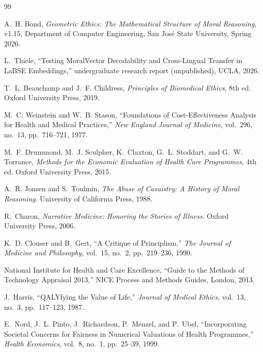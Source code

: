 \documentclass[12pt]{article}
\theoremstyle{definition}
\theoremstyle{remark}
\begin{document}
\begin{thebibliography}{99}

A.~H. Bond, \emph{Geometric Ethics: The Mathematical Structure of Moral Reasoning}, v1.15, Department of Computer Engineering, San Jos\'{e} State University, Spring 2026.

L.~Thiele, ``Testing MoralVector Decodability and Cross-Lingual Transfer in LaBSE Embeddings,'' undergraduate research report (unpublished), UCLA, 2026.

T.~L. Beauchamp and J.~F. Childress, \emph{Principles of Biomedical Ethics}, 8th ed.  Oxford University Press, 2019.

M.~C. Weinstein and W.~B. Stason, ``Foundations of Cost-Effectiveness Analysis for Health and Medical Practices,'' \emph{New England Journal of Medicine}, vol.~296, no.~13, pp.~716--721, 1977.

M.~F. Drummond, M.~J. Sculpher, K.~Claxton, G.~L. Stoddart, and G.~W. Torrance, \emph{Methods for the Economic Evaluation of Health Care Programmes}, 4th ed.  Oxford University Press, 2015.

A.~R. Jonsen and S.~Toulmin, \emph{The Abuse of Casuistry: A History of Moral Reasoning}.  University of California Press, 1988.

R.~Charon, \emph{Narrative Medicine: Honoring the Stories of Illness}.  Oxford University Press, 2006.

K.~D. Clouser and B.~Gert, ``A Critique of Principlism,'' \emph{The Journal of Medicine and Philosophy}, vol.~15, no.~2, pp.~219--236, 1990.

National Institute for Health and Care Excellence, ``Guide to the Methods of Technology Appraisal 2013,'' NICE Process and Methods Guides, London, 2013.

J.~Harris, ``QALYfying the Value of Life,'' \emph{Journal of Medical Ethics}, vol.~13, no.~3, pp.~117--123, 1987.

E.~Nord, J.~L. Pinto, J.~Richardson, P.~Menzel, and P.~Ubel, ``Incorporating Societal Concerns for Fairness in Numerical Valuations of Health Programmes,'' \emph{Health Economics}, vol.~8, no.~1, pp.~25--39, 1999.


\end{thebibliography}
\end{document}
